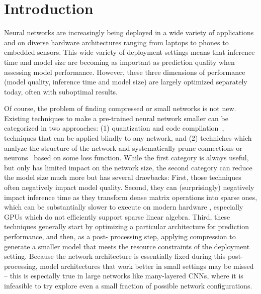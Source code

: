 
\section{Introduction}

Neural networks are increasingly being deployed in a wide variety  of
applications  and on diverse hardware architectures ranging from laptops to
phones to embedded sensors. This wide variety of deployment settings means
that inference time and model size are becoming as important as  prediction
quality when assessing model performance.  However, these three dimensions of
performance (model quality, inference time and model size)  are largely
optimized separately today, often with suboptimal results.

Of course, the problem of finding compressed or small networks is not new.
Existing techniques to make a pre-trained neural network smaller can be categorized in two approaches: (1) quantization \cite{quant} and code compilation~\cite{ma2016compilation}, 
techniques that can be applied blindly to any network, and (2) techniches which analyze the
structure of the network and systematically prune
connections or neurons~\cite{han2015deepcompression,Cun}
based on some loss function. While the first category is always useful, but only has limited 
impact on the network size, the second category can reduce the model size much more but has several 
drawbacks:   First, those techniques often negatively
impact model quality.  Second, they can (surprisingly) negatively impact
inference time as they transform dense matrix operations into sparse ones,
which can be substantially slower to execute on modern hardware
\cite{han2015deepcompression}, especially GPUs which do not efficiently support sparse
linear algebra.  Third, these techniques generally start by optimizing a
particular architecture for prediction performance, and then, as a post-
processing step, applying compression  to generate a smaller model that meets the
resource constraints of the deployment setting.  Because the network
architecture is essentially fixed during this post-processing,   model architectures
that work better in small settings may be missed -- this is especially true in
large networks like many-layered CNNs,  where it is infeasible to try explore
even a small fraction of possible network configurations.


